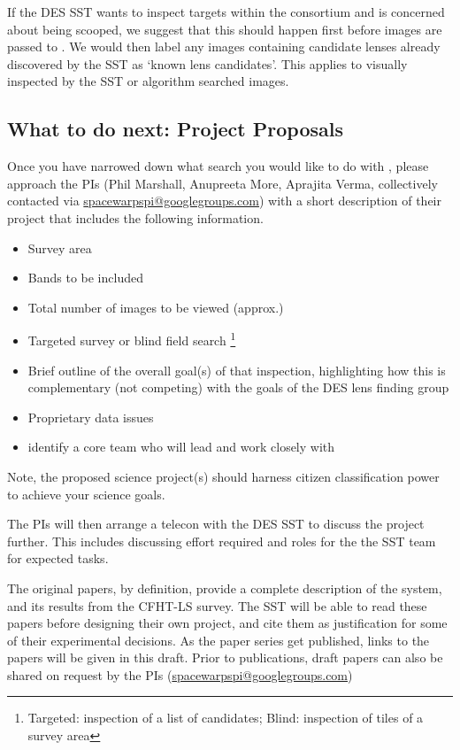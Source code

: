 \documentclass[a4paper,twocolumn]{article}
\begin{document}
If the DES SST wants to inspect targets within the consortium and is concerned about being scooped, we suggest that this should happen first before images are passed to \SW. We would then label any images containing candidate lenses already discovered by the SST as `known lens candidates'. This applies to visually inspected by the SST or algorithm searched images. 


\subsection{What to do next: Project Proposals}
Once you have narrowed down what search you would like to do with \SW, please approach the \SW PIs (Phil Marshall, Anupreeta More, Aprajita Verma, collectively contacted via \href{mailto:spacewarpspi@googlegroups.com}{spacewarpspi@googlegroups.com}) with a short description of their project that includes the following information.

\begin{itemize}
\item Survey area
\item Bands to be included
\item Total number of images to be viewed (approx.)
\item Targeted survey or blind field search \footnote{Targeted: inspection of a list of candidates; Blind: inspection of tiles of a survey area}
\item Brief outline of the overall goal(s) of that inspection, highlighting how this is complementary (not competing) with the goals of the DES lens finding group
\item Proprietary data issues 
\item identify a core team who will lead and work closely with \SW
\end{itemize}

Note, the proposed science project(s) should harness citizen classification power to achieve your science goals.

The \SW PIs will then arrange a telecon with the DES SST to discuss the project further. This includes discussing effort required and roles for the the SST team for expected tasks.

The original \SW papers, by definition, provide a complete description of the system, and its results from the CFHT-LS survey. The SST will be able
to read these papers before designing their own \SW project, and cite them as justification for some of their experimental decisions. As the \SW paper series get published, links to the papers will be given in this draft. Prior to publications, draft papers can also be shared on request by the \SW PIs (\href{mailto:spacewarpspi@googlegroups.com}{spacewarpspi@googlegroups.com})
\end{document}
